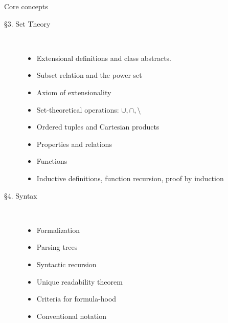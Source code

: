 \begin{frame}{Core concepts}

	\begin{description}
	
		\item[\S3. Set Theory] \
		
			\begin{itemize}
			
				\item Extensional definitions and class abstracts.
				
				\item Subset relation and the power set
				
				\item Axiom of extensionality
				
				\item Set-theoretical operations: $\cup,\cap,\setminus$
				
				\item Ordered tuples and Cartesian products
				
				\item Properties and relations
				
				\item Functions
				
				\item Inductive definitions, function recursion, proof by induction
			
			\end{itemize}
	
		\item[\S4. Syntax] \
		
			\begin{itemize}
													
				\item Formalization
				
				\item Parsing trees
				
				\item Syntactic recursion
				
				\item Unique readability theorem
				
				\item Criteria for formula-hood
			
				\item Conventional notation
			
			\end{itemize}
	
	\end{description}

\end{frame}

